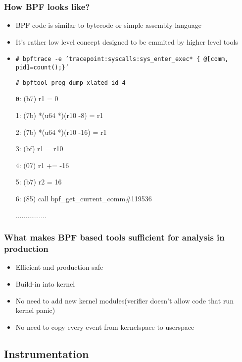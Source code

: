 \documentclass{beamer}
\begin{document}
\begin{frame}
  \frametitle{How BPF looks like?}
  \begin{itemize}
    \item<1-> BPF code is similar to bytecode or simple assembly language
    \item<2-> It's rather low level concept designed to be emmited by higher level tools
    \item<3-> {\scriptsize \texttt{\# bpftrace -e 'tracepoint:syscalls:sys\_enter\_exec* \{ @[comm, pid]=count();\}' }}
		\begin{block}{\scriptsize \texttt{\# bpftool prog dump xlated id 4}}
      {\texttt 
			 0: (b7) r1 = 0

			 1: (7b) *(u64 *)(r10 -8) = r1

			 2: (7b) *(u64 *)(r10 -16) = r1

			 3: (bf) r1 = r10

			 4: (07) r1 += -16

			 5: (b7) r2 = 16

			 6: (85) call bpf\_get\_current\_comm\#119536
			 
			 ................
		  }
      \end{block}
  \end{itemize}
\end{frame}

\begin{frame}
  \frametitle{What makes BPF based tools sufficient for analysis in production}
  \begin{itemize}
    \item<1-> Efficient and production safe 
		\item<2-> Build-in into kernel
    \item<3-> No need to add new kernel modules(verifier doesn't allow code that run kernel panic)
		\item<4-> No need to copy every event from kernelspace to userspace 
	\end{itemize}
\end{frame}

\subsection{Instrumentation}
\end{document}
